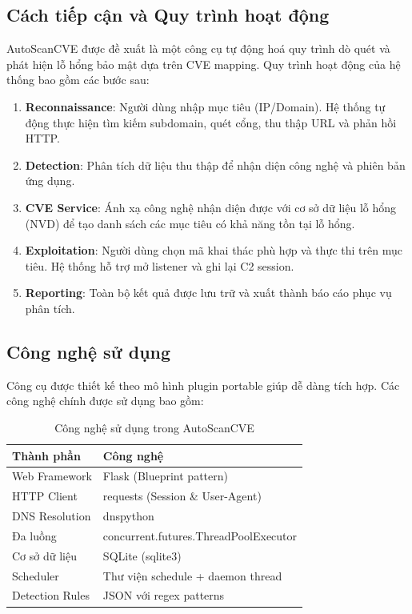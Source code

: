 \documentclass[conference]{IEEEtran}
\begin{document}
\subsection{Cách tiếp cận và Quy trình hoạt động}
AutoScanCVE được đề xuất là một công cụ tự động hoá quy trình dò quét và phát hiện lỗ hổng bảo mật dựa trên CVE mapping. Quy trình hoạt động của hệ thống bao gồm các bước sau:
\begin{enumerate}
    \sloppy
    \item \textbf{Reconnaissance}: Người dùng nhập mục tiêu (IP/\-Domain). Hệ thống tự động thực hiện tìm kiếm subdomain, quét cổng, thu thập URL và phản hồi HTTP.
    \item \textbf{Detection}: Phân tích dữ liệu thu thập để nhận diện công nghệ và phiên bản ứng dụng.
    \item \textbf{CVE Service}: Ánh xạ công nghệ nhận diện được với cơ sở dữ liệu lỗ hổng (NVD) để tạo danh sách các mục tiêu có khả năng tồn tại lỗ hổng.
    \item \textbf{Exploitation}: Người dùng chọn mã khai thác phù hợp và thực thi trên mục tiêu. Hệ thống hỗ trợ mở listener và ghi lại C2 session.
    \item \textbf{Reporting}: Toàn bộ kết quả được lưu trữ và xuất thành báo cáo phục vụ phân tích.
\end{enumerate}

\subsection{Công nghệ sử dụng}
Công cụ được thiết kế theo mô hình plugin portable giúp dễ dàng tích hợp. Các công nghệ chính được sử dụng bao gồm:

\begin{table}[htbp]
\centering
\caption{Công nghệ sử dụng trong AutoScanCVE}
\label{tab:autosancve_tech}
\begin{tabular}{|l|l|}
\hline
\textbf{Thành phần} & \textbf{Công nghệ} \\ \hline
Web Framework & Flask (Blueprint pattern) \\ \hline
HTTP Client & requests (Session \& User-Agent) \\ \hline
DNS Resolution & dnspython \\ \hline
Đa luồng & concurrent.futures.ThreadPoolExecutor \\ \hline
Cơ sở dữ liệu & SQLite (sqlite3) \\ \hline
Scheduler & Thư viện schedule + daemon thread \\ \hline
Detection Rules & JSON với regex patterns \\ \hline
\end{tabular}
\end{table}
\end{document}
